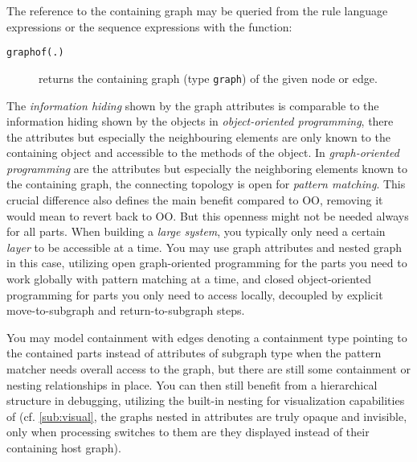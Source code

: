 The reference to the containing graph may be queried from the rule language expressions or the sequence expressions with the \texttt{} function:
\begin{description}
\item[\texttt{graphof(.)}] returns the containing graph (type \texttt{graph}) of the given node or edge.
\end{description}

The \emph{information hiding} shown by the graph attributes is comparable to the information hiding shown by the objects in \emph{object-oriented programming}, there the attributes but especially the neighbouring elements are only known to the containing object and accessible to the methods of the object.
In \emph{graph-oriented programming} are the attributes but especially the neighboring elements known to the containing graph, the connecting topology is open for \emph{pattern matching}.
This crucial difference also defines the main benefit compared to OO, removing it would mean to revert back to OO.
But this openness might not be needed always for all parts.
When building a \emph{large system}, you typically only need a certain \emph{layer} to be accessible at a time.
You may use graph attributes and nested graph in this case,
utilizing open graph-oriented programming for the parts you need to work globally with pattern matching at a time,
and closed object-oriented programming for parts you only need to access locally,
decoupled by explicit move-to-subgraph and return-to-subgraph steps.

You may model containment with edges denoting a containment type pointing to the contained parts instead of attributes of subgraph type
when the pattern matcher needs overall access to the graph, but there are still some containment or nesting relationships in place.
You can then still benefit from a hierarchical structure in debugging, utilizing the built-in nesting for visualization capabilities of \GrG (cf. \ref{sub:visual}, the graphs nested in attributes are truly opaque and invisible, only when processing switches to them are they displayed instead of their containing host graph).

